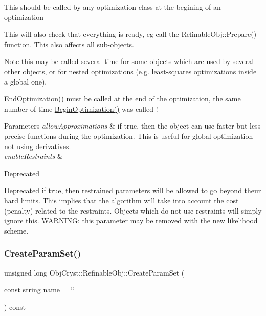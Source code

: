This should be called by any optimization class at the begining of an optimization

This will also check that everything is ready, eg call the Refinable\+Obj\+::\+Prepare() function. This also affects all sub-\/objects. \begin{DoxyNote}{Note}
this may be called several time for some objects which are used by several other objects, or for nested optimizations (e.\+g. least-\/squares optimizations inside a global one).

\mbox{\hyperlink{class_obj_cryst_1_1_refinable_obj_a05342aa16f7b0c0a2cf3380de16f75ef}{End\+Optimization()}} must be called at the end of the optimization, the same number of time \mbox{\hyperlink{class_obj_cryst_1_1_refinable_obj_a55da6256532023f40769c79eef074703}{Begin\+Optimization()}} was called !
\end{DoxyNote}

\begin{DoxyParams}{Parameters}
{\em allow\+Approximations} & if true, then the object can use faster but less precise functions during the optimization. This is useful for global optimization not using derivatives. \\
\hline
{\em enable\+Restraints} & \\
\hline
\end{DoxyParams}
\begin{DoxyRefDesc}{Deprecated}
\item[\mbox{\hyperlink{deprecated__deprecated000002}{Deprecated}}]if true, then restrained parameters will be allowed to go beyond theur hard limits. This implies that the algorithm will take into account the cost (penalty) related to the restraints. Objects which do not use restraints will simply ignore this. W\+A\+R\+N\+I\+NG\+: this parameter may be removed with the new likelihood scheme. \end{DoxyRefDesc}
\mbox{\label{class_obj_cryst_1_1_refinable_obj_abb7ba59ef7cad325753587b484e60bfe}} 
\subsubsection{\texorpdfstring{CreateParamSet()}{CreateParamSet()}}
{\footnotesize\ttfamily unsigned long Obj\+Cryst\+::\+Refinable\+Obj\+::\+Create\+Param\+Set (\begin{DoxyParamCaption}\item[{const string}]{name = {\ttfamily \char`\"{}\char`\"{}} }\end{DoxyParamCaption}) const}



